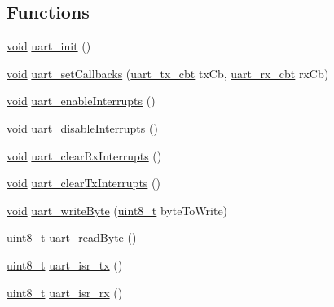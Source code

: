 \subsection*{Functions}
\begin{DoxyCompactItemize}
\item 
\hyperlink{usb__devapi_8h_afabf60e7f57651d6d595a02c75f07cd0}{void} \hyperlink{group__uart_ga0c0ca72359ddf28dcd15900dfba19343}{uart\+\_\+init} ()
\item 
\hyperlink{usb__devapi_8h_afabf60e7f57651d6d595a02c75f07cd0}{void} \hyperlink{group__uart_ga9a390382a1fb16e9d83c1f5a34afb6e3}{uart\+\_\+set\+Callbacks} (\hyperlink{group__uart_gae005b96f0b18aecb814f4979c3e33408}{uart\+\_\+tx\+\_\+cbt} tx\+Cb, \hyperlink{group__uart_gab8f8d6449d6a994dfb5ede3fca7ac4e2}{uart\+\_\+rx\+\_\+cbt} rx\+Cb)
\item 
\hyperlink{usb__devapi_8h_afabf60e7f57651d6d595a02c75f07cd0}{void} \hyperlink{group__uart_ga19d6ac545de3750804fcdd7d5c6ae41e}{uart\+\_\+enable\+Interrupts} ()
\item 
\hyperlink{usb__devapi_8h_afabf60e7f57651d6d595a02c75f07cd0}{void} \hyperlink{group__uart_ga138d10923b5872cc48a30802f9a85308}{uart\+\_\+disable\+Interrupts} ()
\item 
\hyperlink{usb__devapi_8h_afabf60e7f57651d6d595a02c75f07cd0}{void} \hyperlink{group__uart_gad4ce3cb232f8a2a473976527d3497fc6}{uart\+\_\+clear\+Rx\+Interrupts} ()
\item 
\hyperlink{usb__devapi_8h_afabf60e7f57651d6d595a02c75f07cd0}{void} \hyperlink{group__uart_gae5f8c18830d4a12c2ccd5aaab95aa563}{uart\+\_\+clear\+Tx\+Interrupts} ()
\item 
\hyperlink{usb__devapi_8h_afabf60e7f57651d6d595a02c75f07cd0}{void} \hyperlink{group__uart_ga7a4111d6f4c172637301fe00e344e77f}{uart\+\_\+write\+Byte} (\hyperlink{_p_e___types_8h_aba7bc1797add20fe3efdf37ced1182c5}{uint8\+\_\+t} byte\+To\+Write)
\item 
\hyperlink{_p_e___types_8h_aba7bc1797add20fe3efdf37ced1182c5}{uint8\+\_\+t} \hyperlink{group__uart_ga9b9f9e22d7f34dd0a2fe9c3456d12987}{uart\+\_\+read\+Byte} ()
\item 
\hyperlink{_p_e___types_8h_aba7bc1797add20fe3efdf37ced1182c5}{uint8\+\_\+t} \hyperlink{ez430-rf2500_2uart_8c_acf173314d99e04c6e93533ab60cb69a4}{uart\+\_\+isr\+\_\+tx} ()
\item 
\hyperlink{_p_e___types_8h_aba7bc1797add20fe3efdf37ced1182c5}{uint8\+\_\+t} \hyperlink{ez430-rf2500_2uart_8c_ac56d4a57b81f3cc2bfa13f95761ca75b}{uart\+\_\+isr\+\_\+rx} ()
\end{DoxyCompactItemize}
